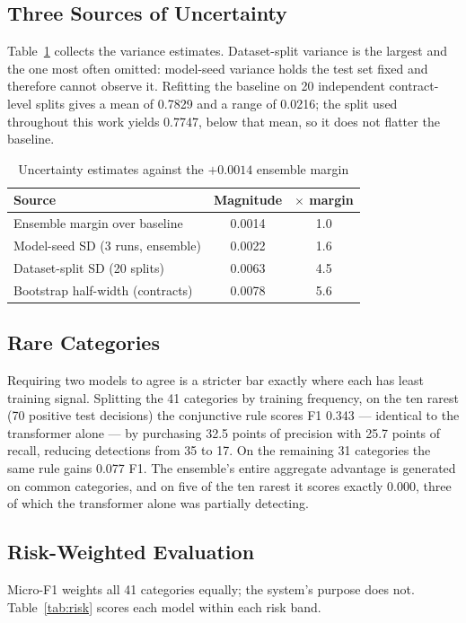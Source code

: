 \documentclass[journal,a4paper]{IEEEtran}
\begin{document}
\subsection{Three Sources of Uncertainty}
Table~\ref{tab:var} collects the variance estimates. Dataset-split variance is the largest and
the one most often omitted: model-seed variance holds the test set fixed and therefore cannot
observe it. Refitting the baseline on 20 independent contract-level splits gives a mean of
0.7829 and a range of 0.0216; the split used throughout this work yields 0.7747, below that
mean, so it does not flatter the baseline.

\begin{table}[!t]
\caption{Uncertainty estimates against the $+0.0014$ ensemble margin}
\label{tab:var}
\centering
\small
\begin{tabular}{lcc}
\toprule
\textbf{Source} & \textbf{Magnitude} & \textbf{$\times$ margin}\\
\midrule
Ensemble margin over baseline & 0.0014 & 1.0\\
Model-seed SD (3 runs, ensemble) & 0.0022 & 1.6\\
Dataset-split SD (20 splits) & 0.0063 & 4.5\\
Bootstrap half-width (contracts) & 0.0078 & 5.6\\
\bottomrule
\end{tabular}
\end{table}

\subsection{Rare Categories}
Requiring two models to agree is a stricter bar exactly where each has least training signal.
Splitting the 41 categories by training frequency, on the ten rarest (70 positive test
decisions) the conjunctive rule scores F1 0.343 --- identical to the transformer alone --- by
purchasing 32.5 points of precision with 25.7 points of recall, reducing detections from 35 to
17. On the remaining 31 categories the same rule gains 0.077 F1. The ensemble's entire aggregate
advantage is generated on common categories, and on five of the ten rarest it scores exactly
0.000, three of which the transformer alone was partially detecting.

\subsection{Risk-Weighted Evaluation}
\label{sec:risk}
Micro-F1 weights all 41 categories equally; the system's purpose does not.
Table~\ref{tab:risk} scores each model within each risk band.
\end{document}
